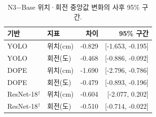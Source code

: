 \begin{table}[t]
\centering\footnotesize
\setlength{\tabcolsep}{4pt}
\caption{N3−Base 위치·회전 중앙값 변화의 사후 95\% 구간.}\label{tab:pose_uncertainty_main}
\begin{tabularx}{\columnwidth}{llrr}
\toprule
기반 & 지표 & 차이 & 95\% 구간 \\
\midrule
YOLO & 위치(cm) & -0.829 & [-1.653, -0.195] \\
YOLO & 회전(도) & -0.468 & [-0.886, -0.092] \\
DOPE & 위치(cm) & -1.690 & [-2.796, -0.786] \\
DOPE & 회전(도) & -0.479 & [-0.893, -0.196] \\
ResNet-18$^\dagger$ & 위치(cm) & -0.604 & [-2.077, 0.202] \\
ResNet-18$^\dagger$ & 회전(도) & -0.510 & [-0.714, -0.022] \\
\bottomrule
\end{tabularx}
\end{table}
